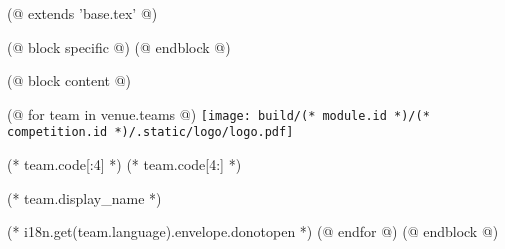 (@ extends 'base.tex' @)

(@ block specific @)
    \geometry{paper=c5paper, landscape}
(@ endblock @)

(@ block content @)
    \pagestyle{empty}
    \centering

    (@ for team in venue.teams @)
        \texttt{[image: build/(* module.id *)/(* competition.id *)/.static/logo/logo.pdf]}%
        \vspace*{5mm}

        \fontsize{60}{0}\selectfont%
        (* team.code[:4] *)%
        \fontsize{80}{0}\selectfont%
        (* team.code[4:] *)%

        \vspace{5mm}
        \fontsize{15}{0}\selectfont
        (* team.display_name *)

        \vspace{15mm}
        \normalsize
        (* i18n.get(team.language).envelope.donotopen *)
        \newpage
    (@ endfor @)
(@ endblock @)
